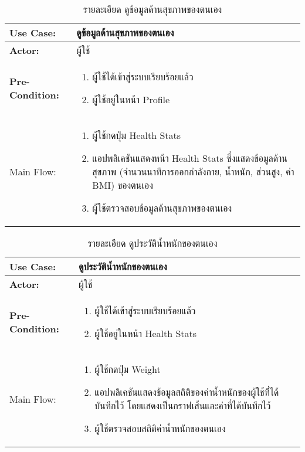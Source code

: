\begin{table}
    \caption{รายละเอียด ดูข้อมูลด้านสุขภาพของตนเอง}
    \begin{tabularx}{\textwidth}{ | >{\centering\bf} p{3cm} | X |}
        \hline
        Use Case: & ดูข้อมูลด้านสุขภาพของตนเอง \\\hline
        Actor: & ผู้ใช้ \\\hline
        Pre-Condition: &
        \begin{enumerate}[table]
            \item ผู้ใช้ได้เข้าสู่ระบบเรียบร้อยแล้ว
            \item ผู้ใช้อยู่ในหน้า Profile            
        \end{enumerate} \\\hline
        
        Main Flow: & 
        \begin{enumerate}[table]
            \item ผู้ใช้กดปุ่ม Health Stats
            \item แอปพลิเคชันแสดงหน้า Health Stats ซึ่งแสดงข้อมูลด้านสุขภาพ (จำนวนนาทีการออกกำลังกาย, น้ำหนัก, ส่วนสูง, ค่า BMI) ของตนเอง
            \item ผู้ใช้ตรวจสอบข้อมูลด้านสุขภาพของตนเอง  
        \end{enumerate}\\\hline
    \end{tabularx}
\end{table}


\begin{table}
    \caption{รายละเอียด ดูประวัติน้ำหนักของตนเอง}
    \begin{tabularx}{\textwidth}{ | >{\centering\bf} p{3cm} | X |}
        \hline
        Use Case: & ดูประวัติน้ำหนักของตนเอง \\\hline
        Actor: & ผู้ใช้ \\\hline
        Pre-Condition: &
        \begin{enumerate}[table]
            \item ผู้ใช้ได้เข้าสู่ระบบเรียบร้อยแล้ว
            \item ผู้ใช้อยู่ในหน้า Health Stats          
        \end{enumerate} \\\hline
        
        Main Flow: & 
        \begin{enumerate}[table]
            \item ผู้ใช้กดปุ่ม Weight
            \item แอปพลิเคชันแสดงข้อมูลสถิติของค่าน้ำหนักของผู้ใช้ที่ได้บันทึกไว้ โดยแสดงเป็นกราฟเส้นและค่าที่ได้บันทึกไว้
            \item ผู้ใช้ตรวจสอบสถิติค่าน้ำหนักของตนเอง
        \end{enumerate}\\\hline
    \end{tabularx}
\end{table}



